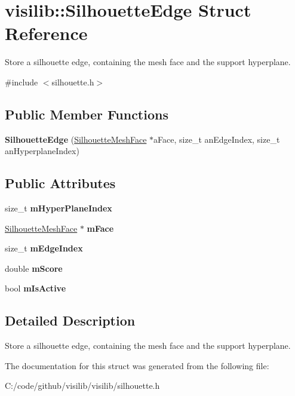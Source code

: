 \hypertarget{structvisilib_1_1_silhouette_edge}{}\section{visilib\+::Silhouette\+Edge Struct Reference}
\label{structvisilib_1_1_silhouette_edge}


Store a silhouette edge, containing the mesh face and the support hyperplane.  




{\ttfamily \#include $<$silhouette.\+h$>$}

\subsection*{Public Member Functions}
\begin{DoxyCompactItemize}
\item 
\mbox{\label{structvisilib_1_1_silhouette_edge_a894736143f0b9d6b0320922216192a46}} 
{\bfseries Silhouette\+Edge} (\mbox{\hyperlink{classvisilib_1_1_silhouette_mesh_face}{Silhouette\+Mesh\+Face}} $\ast$a\+Face, size\+\_\+t an\+Edge\+Index, size\+\_\+t an\+Hyperplane\+Index)
\end{DoxyCompactItemize}
\subsection*{Public Attributes}
\begin{DoxyCompactItemize}
\item 
\mbox{\label{structvisilib_1_1_silhouette_edge_aec1b2891776743cef966392f1959caed}} 
size\+\_\+t {\bfseries m\+Hyper\+Plane\+Index}
\item 
\mbox{\label{structvisilib_1_1_silhouette_edge_abcaefffdb0a72f109060c0053f30c9e1}} 
\mbox{\hyperlink{classvisilib_1_1_silhouette_mesh_face}{Silhouette\+Mesh\+Face}} $\ast$ {\bfseries m\+Face}
\item 
\mbox{\label{structvisilib_1_1_silhouette_edge_add5ccfee703556c1d453d40bcf2fc969}} 
size\+\_\+t {\bfseries m\+Edge\+Index}
\item 
\mbox{\label{structvisilib_1_1_silhouette_edge_af4db80b5161c888d044ad4b7fd15435b}} 
double {\bfseries m\+Score}
\item 
\mbox{\label{structvisilib_1_1_silhouette_edge_ab5327c9ef3df2a50ac8e462b0c24b2e9}} 
bool {\bfseries m\+Is\+Active}
\end{DoxyCompactItemize}


\subsection{Detailed Description}
Store a silhouette edge, containing the mesh face and the support hyperplane. 

The documentation for this struct was generated from the following file\+:\begin{DoxyCompactItemize}
\item 
C\+:/code/github/visilib/visilib/silhouette.\+h\end{DoxyCompactItemize}
